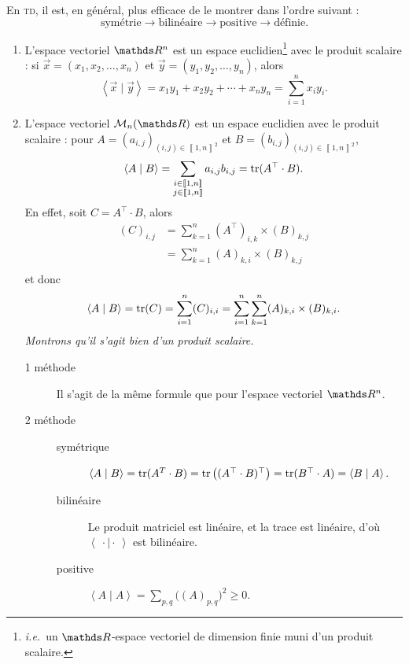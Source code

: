 En \textsc{td}, il est, en général, plus efficace de le montrer dans l'ordre suivant : \[
	\text{symétrie} \longrightarrow \text{bilinéaire} \longrightarrow \text{positive} \longrightarrow \text{définie}
.\]

\begin{exm}
	\begin{enumerate}
		\item L'espace vectoriel $\R^n$\/ est un espace euclidien\footnote{\textit{i.e.}\ un $\R$-espace vectoriel de dimension finie muni d'un produit scalaire.} avec le produit scalaire : si $\vec{x} = (x_1, x_2, \ldots, x_n)$\/ et $\vec{y} = (y_1, y_2, \ldots, y_n)$, alors \[
				\left<\vec{x}  \mid \vec{y} \right> = x_1y_1 + x_2y_2 + \cdots + x_n y_n = \sum_{i=1}^n x_i y_i
			.\]
		\item L'espace vectoriel $\mathcal{M}_n(\R)$\/ est un espace euclidien avec le produit scalaire : pour $A = (a_{i,j})_{(i,j) \in \left\llbracket 1,n \right\rrbracket^2}$\/ et $B = (b_{i,j})_{(i,j) \in \left\llbracket 1,n \right\rrbracket^2}$, \[
				\left<A  \mid B \right> = \sum_{\substack{i \in \left\llbracket 1,n \right\rrbracket\\ j \in \left\llbracket 1,n \right\rrbracket}} a_{i,j} b_{i,j} = \operatorname{tr}(A^\top \cdot B)
			.\]
			En effet, soit $C = A^\top \cdot B$, alors
			\begin{align*}
				(C)_{i,j} &= \sum_{k=1}^n (A^\top)_{i,k} \times (B)_{k,j}\\
				&= \sum_{k=1}^n (A)_{k,i} \times (B)_{k,j} \\
			\end{align*}
			et donc \[
				\left<A  \mid B \right> = \operatorname{tr}(C) = \sum_{i=1}^n (C)_{i,i} = \sum_{i=1}^n \sum_{k=1}^n (A)_{k,i} \times (B)_{k,i}
			.\]
			\textsl{Montrons qu'il s'agit bien d'un produit scalaire.}
			\begin{description}
				\item[1 méthode] Il s'agit de la même formule que pour l'espace vectoriel $\R^n$.
				\item[2 méthode]
					\begin{description}
						\item[symétrique] $\left<A  \mid B \right> = \operatorname{tr}(A^T \cdot B) = \operatorname{tr}\big((A^\top \cdot B)^\top\big) = \operatorname{tr}(B^\top \cdot A) = \left< B  \mid A\right>$.
						\item[bilinéaire] Le produit matriciel est linéaire, et la trace est linéaire, d'où $\left<\:\cdot  \mid \cdot \:\right>$\/ est bilinéaire.
						\item[positive] $\left< A \mid A\right> = \sum_{p,q} \big((A)_{p,q}\big)^2 \ge 0$.

\end{description}
\end{description}
\end{enumerate}
\end{exm}
